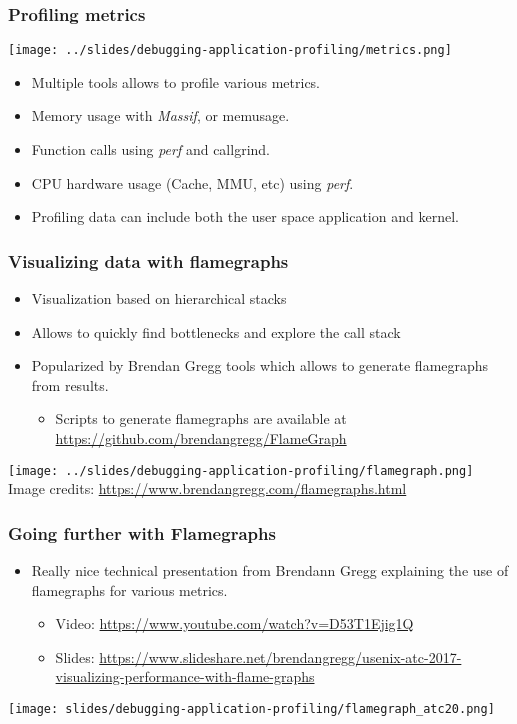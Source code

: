 \begin{frame}
  \frametitle{Profiling metrics}
  \center \texttt{[image: ../slides/debugging-application-profiling/metrics.png]}
  \begin{itemize}
    \item Multiple tools allows to profile various metrics.
    \item Memory usage with {\em Massif},  or memusage.
    \item Function calls using {\em perf} and callgrind.
    \item CPU hardware usage (Cache, MMU, etc) using {\em perf}.
    \item Profiling data can include both the user space application and kernel.
  \end{itemize}
\end{frame}

\begin{frame}
  \frametitle{Visualizing data with flamegraphs}
  \begin{itemize}
    \item Visualization based on hierarchical stacks
    \item Allows to quickly find bottlenecks and explore the call stack
    \item Popularized by Brendan Gregg tools which allows to generate
          flamegraphs from  results.
    \begin{itemize}
      \item Scripts to generate flamegraphs are available at
            \url{https://github.com/brendangregg/FlameGraph}
    \end{itemize} 
  \end{itemize}
  \center \texttt{[image: ../slides/debugging-application-profiling/flamegraph.png]}\\
  \tiny Image credits: \url{https://www.brendangregg.com/flamegraphs.html}
\end{frame}

\begin{frame}[fragile]
  \frametitle{Going further with Flamegraphs}
  \begin{itemize}
    \item Really nice technical presentation from Brendann Gregg explaining
          the use of flamegraphs for various metrics.
    \begin{itemize}
      \item Video: \url{https://www.youtube.com/watch?v=D53T1Ejig1Q}
      \item Slides: \url{https://www.slideshare.net/brendangregg/usenix-atc-2017-visualizing-performance-with-flame-graphs}
    \end{itemize}
  \end{itemize}
  \begin{center}
  \center\texttt{[image: slides/debugging-application-profiling/flamegraph\_atc20.png]}
  \end{center}
\end{frame}

